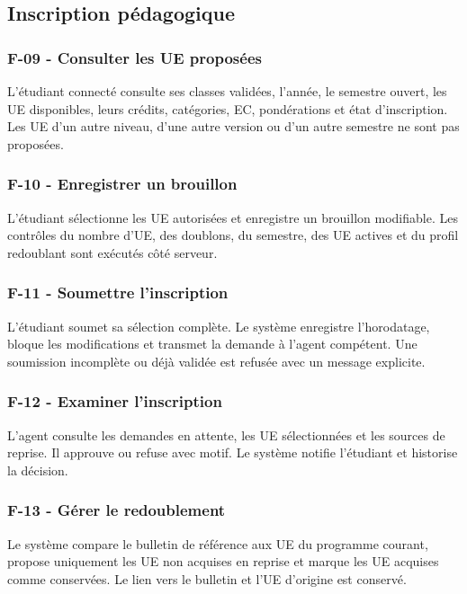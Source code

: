 \documentclass[11pt,a4paper]{article}
\newcommand{\req}[3]{\subsubsection*{#1 - #2}\noindent #3\par\medskip}
\begin{document}
\subsection{Inscription pédagogique}
\req{F-09}{Consulter les UE proposées}{L'étudiant connecté consulte ses classes validées, l'année, le semestre ouvert, les UE disponibles, leurs crédits, catégories, EC, pondérations et état d'inscription. Les UE d'un autre niveau, d'une autre version ou d'un autre semestre ne sont pas proposées.}
\req{F-10}{Enregistrer un brouillon}{L'étudiant sélectionne les UE autorisées et enregistre un brouillon modifiable. Les contrôles du nombre d'UE, des doublons, du semestre, des UE actives et du profil redoublant sont exécutés côté serveur.}
\req{F-11}{Soumettre l'inscription}{L'étudiant soumet sa sélection complète. Le système enregistre l'horodatage, bloque les modifications et transmet la demande à l'agent compétent. Une soumission incomplète ou déjà validée est refusée avec un message explicite.}
\req{F-12}{Examiner l'inscription}{L'agent consulte les demandes en attente, les UE sélectionnées et les sources de reprise. Il approuve ou refuse avec motif. Le système notifie l'étudiant et historise la décision.}
\req{F-13}{Gérer le redoublement}{Le système compare le bulletin de référence aux UE du programme courant, propose uniquement les UE non acquises en reprise et marque les UE acquises comme conservées. Le lien vers le bulletin et l'UE d'origine est conservé.}
\end{document}
